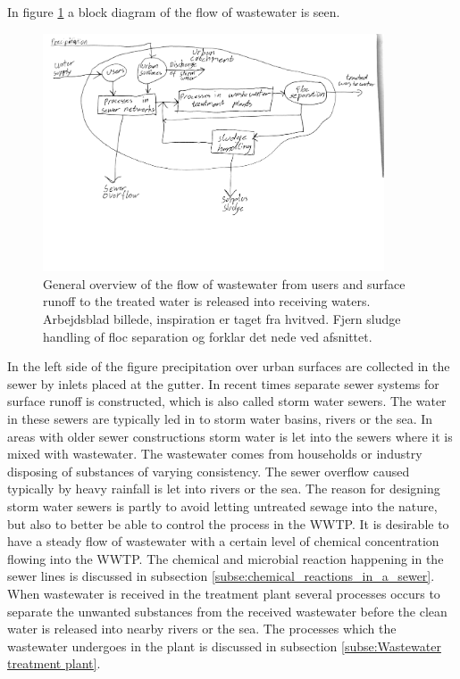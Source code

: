 In figure \ref{fig:sewer_overview_of_the_different_parts} a block diagram of the flow of wastewater is seen.
\begin{figure}[H]
\centering
\includegraphics[width=0.9\textwidth]{report/introduction/pictures/sewer_process2.pdf}
\caption{General overview of the flow of wastewater from users and surface runoff to the treated water is released into receiving waters. Arbejdsblad billede, inspiration er taget fra hvitved. Fjern sludge handling of floc separation og forklar det nede ved afsnittet.}
\label{fig:sewer_overview_of_the_different_parts}
\end{figure}

In the left side of the figure precipitation over urban surfaces are collected in the sewer by inlets placed at the gutter. 
In recent times separate sewer systems for surface runoff is constructed, which is also called storm water sewers. The water in these sewers are typically led in to storm water basins, rivers or the sea. In areas with older sewer constructions storm water is let into the sewers where it is mixed with wastewater. The wastewater comes from households or industry disposing of substances of varying consistency. The sewer overflow caused typically by heavy rainfall is let into rivers or the sea. 
The reason for designing storm water sewers is partly to avoid letting untreated sewage into the nature, but also to better be able to control the process in the WWTP. It is desirable to have a steady flow of wastewater with a certain level of chemical concentration flowing into the WWTP. The chemical and microbial reaction happening in the sewer lines is discussed in subsection \ref{subse:chemical_reactions_in_a_sewer}. When wastewater is received in the treatment plant several processes occurs to separate the unwanted substances from the received wastewater before the clean water is released into nearby rivers or the sea. The processes which the wastewater undergoes in the plant is discussed in subsection \ref{subse:Wastewater treatment plant}.  


